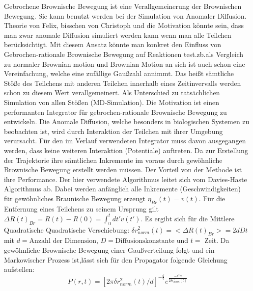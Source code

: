 \documentclass[
  a4paper,BCOR10mm,oneside,
  bibtotoc,idxtotoc,
  headsepline,footsepline,%
  fleqn,openbib
]{scrbook}
\begin{document}
Gebrochene Brownische Bewegung ist eine Verallgemeinerung der Brownischen Bewegung. Sie kann benutzt werden bei der Simulation von Anomaler Diffusion.\newline \newline
Theorie von Felix, bisschen von Christoph und die Motivation könnte sein, dass man zwar anomale Diffusion simuliert werden kann wenn man alle Teilchen berücksichtigt. Mit diesem Ansatz könnte man konkret den Einfluss von Gebrochen-rationale Brownische Bewegung auf Reaktionen test.zb.als Vergleich zu normaler Brownian motion und Brownian Motion an sich ist auch schon eine Vereinfachung, welche eine zufällige Gaußzahl annimmt. Das heißt sämtliche Stöße des Teilchens mit anderen Teilchen innerhalb eines Zeitinvervalls werden schon zu diesem Wert verallgemeinert. Als Unterschied zu tatsächlichen Simulation von allen Stößen (MD-Simulation).
Die Motivation ist einen performanten Integrator für gebrochen-rationale Brownische Bewegung zu entwickeln. Die Anomale Diffusion, welche besonders in biologischen Systemen zu beobachten ist, wird durch Interaktion der Teilchen mit ihrer Umgebung verursacht. Für den im Verlauf verwendeten Integrator muss davon ausgegangen werden, dass keine weiteren Interaktion (Potentiale) auftreten. Da zur Erstellung der Trajektorie ihre sämtlichen Inkremente im voraus durch gewöhnliche Brownische Bewegung erstellt werden müssen. Der Vorteil von der Methode ist ihre Performance.  
Der hier verwendete Algorithmus leitet sich vom Davies-Haste Algorithmus \cite{Craigmile2003} ab.
Dabei werden anfänglich alle Inkremente (Geschwindigkeiten) für gewöhnliches Braunische Bewegung erzeugt $\eta_{Br}(t)= v(t)$. Für die Entfernung eines Teilchens zu seinem Ursprung gilt  $\Delta R(t)_{Br} = R(t)- R(0)= \int^t_{0}dt' v(t')$. Es ergibt sich für die Mittlere Quadratische Quadratische Verschiebung: \newline $\delta r^{2}_{norm}(t)= < \Delta R(t)_{Br}>=2dDt$ mit $d =\text{Anzahl der Dimension}$, $D = \text{Diffusionskonstante}$ und $t=$ Zeit. Da gewöhnliche Brownische Bewegung einer Gaußverteilung folgt und ein Markowischer Prozess ist,lässt sich für den Propagator  folgende Gleichung aufstellen:
\begin{equation}
 P(r,t)=[2 \pi \delta r^{2}_{norm}(t)/d]^{-\frac{d}{2}} e^{ \frac{-r^2 d}{2 \delta r^{2}_{norm}(t) }}
\end{equation}
\end{document}
